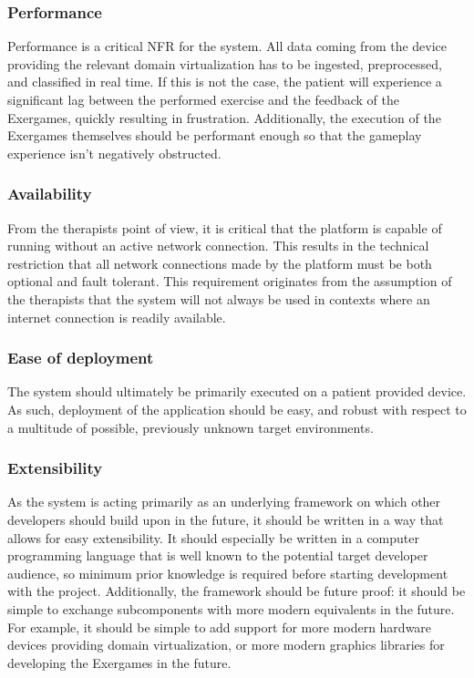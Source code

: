 \subsubsection{Performance}
Performance is a critical \gls{NFR} for the system. All data coming from the device providing the relevant domain virtualization has to be ingested, preprocessed, and classified in real time. If this is not the case, the patient will experience a significant lag between the performed exercise and the feedback of the Exergames, quickly resulting in frustration. Additionally, the execution of the Exergames themselves should be performant enough so that the gameplay experience isn't negatively obstructed. 

\subsubsection{Availability}
From the therapists point of view, it is critical that the platform is capable of running without an active network connection. This results in the technical restriction that all network connections made by the platform must be both optional and fault tolerant. This requirement originates from the assumption of the therapists that the system will not always be used in contexts where an internet connection is readily available.


\subsubsection{Ease of deployment}
The system should ultimately be primarily executed on a patient provided device. As such, deployment of the application should be easy, and robust with respect to a multitude of possible, previously unknown target environments.

\subsubsection{Extensibility}
As the system is acting primarily as an underlying framework on which other developers should build upon in the future, it should be written in a way that allows for easy extensibility. It should especially be written in a computer programming language that is well known to the potential target developer audience, so minimum prior knowledge is required before starting development with the project. Additionally, the framework should be future proof: it should be simple to exchange subcomponents with more modern equivalents in the future. For example, it should be simple to add support for more modern hardware devices providing domain virtualization, or more modern graphics libraries for developing the Exergames in the future.

